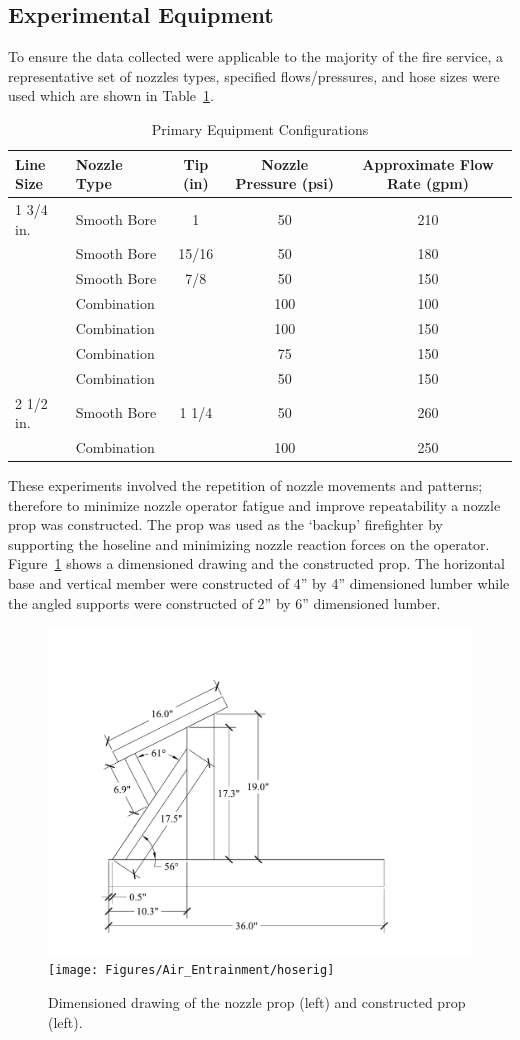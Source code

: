 \documentclass[12pt,oneside]{book}
\begin{document}
\subsection{Experimental Equipment}

To ensure the data collected were applicable to the majority of the fire service, a representative set of nozzles types, specified flows/pressures, and hose sizes were used which are shown in Table~\ref{tab:nozzles_used_detail}.

\begin{table}[!ht]
\centering
\caption{Primary Equipment Configurations}
\label{tab:nozzles_used_detail}
\begin{tabular}{llccc}
\toprule[1.5pt]
Line Size & Nozzle Type & Tip (in) & Nozzle Pressure (psi) & Approximate Flow Rate (gpm) \\ 
\midrule
1 3/4 in. & Smooth Bore          & 1      & 50 & 210 \\
          & Smooth Bore          & 15/16  & 50 & 180 \\
          & Smooth Bore          & 7/8    & 50 & 150 \\
          & Combination          &        & 100 & 100 \\
          & Combination          &        & 100 & 150 \\
          & Combination          &        & 75 & 150 \\
          & Combination          &        & 50 & 150 \\ \midrule
2 1/2 in. & Smooth Bore          & 1 1/4  & 50 & 260 \\
          & Combination          &        & 100 & 250 \\
\bottomrule[1.25pt]
\end{tabular}
\end{table}

These experiments involved the repetition of nozzle movements and patterns; therefore to minimize nozzle operator fatigue and improve repeatability a nozzle prop was constructed. The prop was used as the `backup' firefighter by supporting the hoseline and minimizing nozzle reaction forces on the operator. Figure~\ref{fig:Nozzle_Prop} shows a dimensioned drawing and the constructed prop. The horizontal base and vertical member were constructed of 4'' by 4'' dimensioned lumber while the angled supports were constructed of 2'' by 6'' dimensioned lumber.

\begin{figure}[!ht]
\centering
    \includegraphics[width=.4\columnwidth]{Figures/Water_Distribution/GIBside}
	\texttt{[image: Figures/Air\_Entrainment/hoserig]}
	\caption[Nozzle Prop]{Dimensioned drawing of the nozzle prop (left) and constructed prop (left).}
	\label{fig:Nozzle_Prop}
\end{figure}
\end{document}
